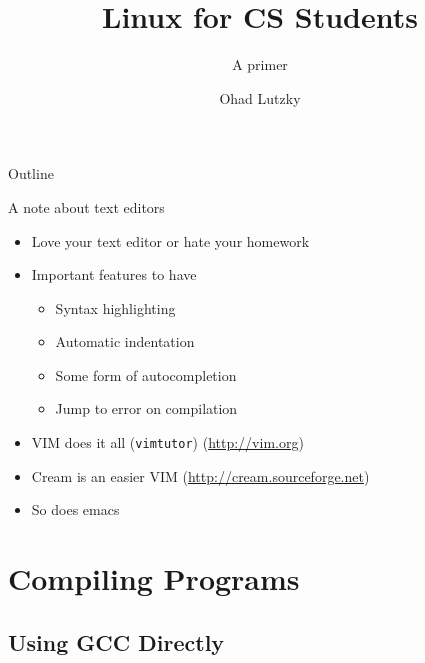 \documentclass[handout]{beamer}
\title[Linux CS Primer] {Linux for CS Students}
\subtitle {A primer}
\author{Ohad Lutzky}
\institute
{
Department of Computer Science\\
Technion IIT
}
\begin{document}
\begin{frame}
  \titlepage
\end{frame}

\begin{frame}{Outline}
  \tableofcontents
\end{frame}



\begin{frame}{A note about text editors}
  \begin{itemize}
    \item Love your text editor or hate your homework
    \item Important features to have
      \pause
      \begin{itemize}
        \item Syntax highlighting \pause
        \item Automatic indentation \pause
        \item Some form of autocompletion \pause
        \item Jump to error on compilation
      \end{itemize}
      \pause
    \item VIM does it all (\texttt{vimtutor})
      (\href{http://vim.org}{http://vim.org})
    \item Cream is an easier VIM
      (\href{http://cream.sourceforge.net}{http://cream.sourceforge.net})
      \pause
    \item So does emacs
  \end{itemize}
\end{frame}

\section{Compiling Programs}

\subsection{Using GCC Directly}
\end{document}
